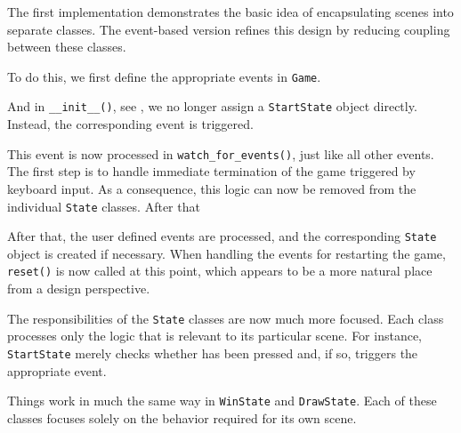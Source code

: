 \begin{hintbox}
	The first implementation demonstrates the basic idea of encapsulating scenes into separate classes. The event-based version refines this design by reducing coupling between these classes.
\end{hintbox}


To do this, we first define the appropriate events in \texttt{Game}.


And in \texttt{\_\_init\_\_()}, see , we no longer assign a \texttt{StartState} object directly. Instead, the corresponding event is triggered.


This event is now processed in \texttt{watch\_for\_events()}, just like all other events. The first step is to handle immediate termination of the game triggered by keyboard input. As a consequence, this logic can now be removed from the individual \texttt{State} classes. After that

After that, the user defined events are processed, and the corresponding \texttt{State} object is created if necessary. When handling the events for restarting the game, \texttt{reset()} is now called at this point, which appears to be a more natural place from a design perspective.


The responsibilities of the \texttt{State} classes are now much more focused. Each class processes only the logic that is relevant to its particular scene. For instance, \texttt{StartState} merely checks whether  has been pressed and, if so, triggers the appropriate event.


Things work in much the same way in \texttt{WinState} and \texttt{DrawState}. Each of these classes focuses solely on the behavior required for its own scene.


